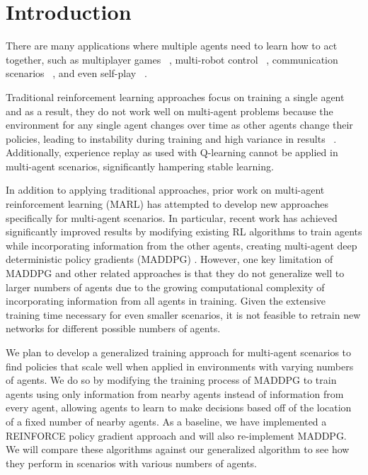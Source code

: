\documentclass{article}
\begin{document}
\section{Introduction}
\label{submission}

There are many applications where multiple agents need to learn how to act together, such as multiplayer games ~\cite{multigames}, multi-robot control ~\cite{multirobot}, communication scenarios ~\cite{communication}, and even self-play ~\cite{selfplay}.

Traditional reinforcement learning approaches focus on training a single agent and as a result, they do not work well on multi-agent problems because the environment for any single agent changes over time as other agents change their policies, leading to instability during training and high variance in results ~\cite{unstable}. Additionally, experience replay as used with Q-learning cannot be applied in multi-agent scenarios, significantly hampering stable learning.

In addition to applying traditional approaches, prior work on multi-agent reinforcement learning (MARL) has attempted to develop new approaches specifically for multi-agent scenarios. In particular, recent work has achieved significantly improved results by modifying existing RL algorithms to train agents while incorporating information from the other agents, creating multi-agent deep deterministic policy gradients (MADDPG) \cite{maddpg}. However, one key limitation of MADDPG and other related approaches is that they do not generalize well to larger numbers of agents due to the growing computational complexity of incorporating information from all agents in training. Given the extensive training time necessary for even smaller scenarios, it is not feasible to retrain new networks for different possible numbers of agents.

We plan to develop a generalized training approach for multi-agent scenarios to find policies that scale well when applied in environments with varying numbers of agents. We do so by modifying the training process of MADDPG to train agents using only information from nearby agents instead of information from every agent, allowing agents to learn to make decisions based off of the location of a fixed number of nearby agents. As a baseline, we have implemented a REINFORCE policy gradient approach and will also re-implement MADDPG. We will compare these algorithms against our generalized algorithm to see how they perform in scenarios with various numbers of agents.
\end{document}
